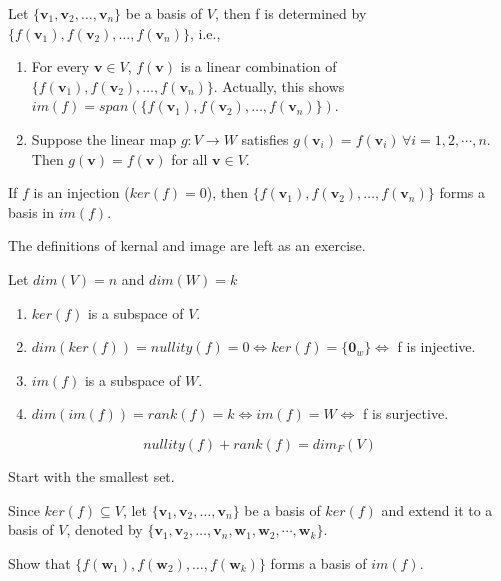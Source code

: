 \documentclass[12pt]{article}
\begin{document}
\begin{theorem}
    Let $\{\mathbf{v}_1,\mathbf{v}_2,\ldots,\mathbf{v}_n\}$ be a basis of $V$, then f is determined by $\{f(\mathbf{v}_1),f(\mathbf{v}_2),\ldots,f(\mathbf{v}_n)\}$, i.e., 
\begin{enumerate}
    \item For every $\mathbf{v}\in V$, $f(\mathbf{v})$ is a linear combination of $\{f(\mathbf{v}_1),f(\mathbf{v}_2),\ldots,f(\mathbf{v}_n)\}$. Actually, this shows $im(f)=span(\{f(\mathbf{v}_1),f(\mathbf{v}_2),\ldots,f(\mathbf{v}_n)\}).$
    \item Suppose the linear map $g: V\rightarrow W$ satisfies $g(\mathbf{v}_i)=f(\mathbf{v}_i)\, \forall i=1,2,\cdots ,n$. Then $g(\mathbf{v})=f(\mathbf{v})$ for all $\mathbf{v}\in V.$ 
\end{enumerate}
\end{theorem}

\begin{corollary}
    If $f$ is an injection ($ker(f)=0$), then $\{f(\mathbf{v}_1),f(\mathbf{v}_2),\ldots,f(\mathbf{v}_n)\}$ forms a basis in $im(f)$.
\end{corollary}

The definitions of kernal and image are left as an exercise.

\begin{theorem}
    Let $dim(V)=n$ and $dim(W)=k$
    \begin{enumerate}
        \item $ker(f)$ is a subspace of $V$.
        \item $dim(ker(f))=nullity(f)=0\Leftrightarrow ker(f)=\{\mathbf{0}_w\}\Leftrightarrow$ f is injective.
        \item $im(f)$ is a subspace of $W$.
        \item $dim(im(f))=rank(f)=k\Leftrightarrow im(f)=W\Leftrightarrow$ f is surjective.
    \end{enumerate}
\end{theorem}


\begin{theorem}
\[ nullity(f) + rank (f) = dim_F(V) \]    
\end{theorem}

\begin{tcolorbox}[boxrule=0.5pt]
\begin{pf}
Start with the smallest set. 

Since $ker(f)\subseteq V$, let $\{\mathbf{v}_1,\mathbf{v}_2,\ldots,\mathbf{v}_n\}$ be a basis of $ker(f)$ and extend it to a basis of $V$, denoted by $\{\mathbf{v}_1,\mathbf{v}_2,\ldots,\mathbf{v}_n, \mathbf{w}_1, \mathbf{w}_2,\cdots,\mathbf{w}_k\}$.

Show that $\{ f(\mathbf{w}_1),f(\mathbf{w}_2),\ldots,f(\mathbf{w}_k)\}$ forms a basis of $im(f)$.
\end{pf}
\end{tcolorbox}
\end{document}
